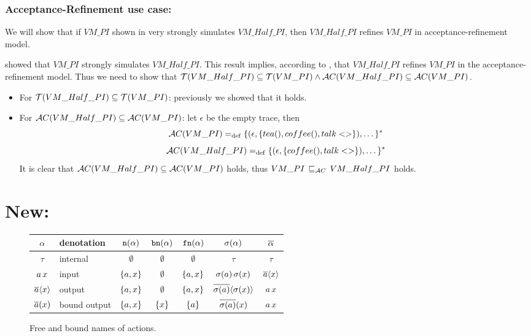 \subsubsection{Acceptance-Refinement use case:}
 We will show that if $VM\_PI$ shown in  very strongly simulates $VM\_Half\_PI$, then $VM\_Half\_PI$ refines $VM\_PI$ in acceptance-refinement model.
 
  showed that $VM\_PI$ strongly simulates $VM\_Half\_PI$. This result implies, according to , that $VM\_Half\_PI$ refines $VM\_PI$ in the acceptance-refinement model. Thus we need to show that $\Traces[VM\_Half\_PI]\subseteq\Traces[VM\_PI] \wedge \Accepatances[VM\_Half\_PI]\subseteq\Accepatances[VM\_PI]$.
 
 \begin{itemize}
\item For $\Traces[VM\_Half\_PI]\subseteq\Traces[VM\_PI]$: previously we showed that it holds. 

\item For $\Accepatances[VM\_Half\_PI]\subseteq\Accepatances[VM\_PI]$: let $\epsilon$ be the empty trace, then
    \[\Accepatances[VM\_PI] \define \{(\epsilon,\{tea(),coffee(),talk<>\}),\dots\}^\ast\]
    \[\Accepatances[VM\_Half\_PI] \define \{(\epsilon,\{coffee(),talk<>\}),\dots\}^\ast\]
It is clear that $\Accepatances[VM\_Half\_PI]\subseteq\Accepatances[VM\_PI]$ holds, thus $VM\_PI \refiAC VM\_Half\_PI$ holds.
\end{itemize}

\section{ New:}
\begin{figure}[!h]
\centering
\begin{tabular}{c|l|c|c|c|c|c}%
$\alpha$      & denotation   & $\mathtt{n}(\alpha)$ & $\mathtt{bn}(\alpha)$ & $\mathtt{fn}(\alpha)$ & $\sigma(\alpha)$ & $\overline{\alpha}$\\\hline\hline%
$\tau$        & internal     & $\emptyset$  & $\emptyset$   & $\emptyset$   & $\tau$ & $\tau$\\%
$a\,x$  & input        & $\set{a,x}$  & $\emptyset$   & $\set{a,x}$   & $\sigma(a)\,\sigma(x)$ & $\overline{a}\langle x\rangle$\\%
$\overline{a}\langle x\rangle$  & output       & $\set{a,x}$  & $\emptyset$   & $\set{a,x}$   & $\overline{\sigma(a)}\langle\sigma(x)\rangle$ & $a\,x$\\%
$\overline{a}(x)$ & bound output & $\set{a,x}$  & $\set{x}$     & $\set{a}$     & $\overline{\sigma(a)}(x)$ & $a\,x$ %
\end{tabular}
\caption{Free and bound names of actions.}
\label{fig_names_act}
\end{figure}


